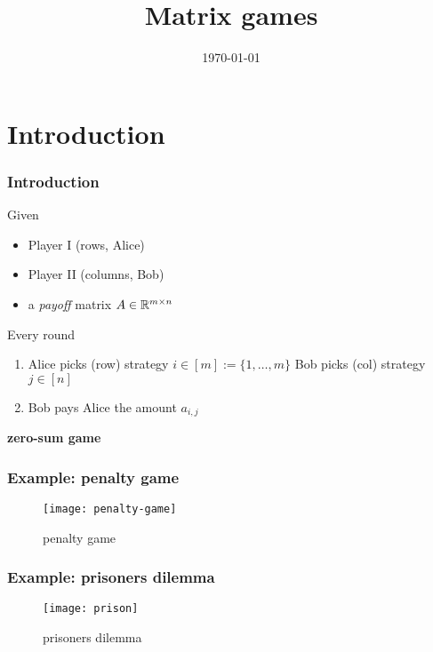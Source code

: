 \documentclass{beamer}
\title{Matrix games}
\date{\today}
\begin{document}
\maketitle
\frame{\tableofcontents}

\section{Introduction}%

\begin{frame}
  \frametitle{Introduction}
  Given
  \begin{itemize}
    \item Player I (rows, Alice)
          \item Player II (columns, Bob)
          \item a \emph{payoff} matrix $A \in \mathbb{R}^{m \times n}$
  \end{itemize}
  Every round
  \begin{enumerate}
    \item Alice picks (row) strategy $i\in [m]:= \{1,\dots, m\}$
          Bob picks (col) strategy $j\in [n]$
    \item Bob pays Alice the amount $a_{i,j}$
  \end{enumerate}
  \begin{center}
    \textbf{zero-sum game}
  \end{center}
\end{frame}

\begin{frame}
  \frametitle{Example: penalty game}
  \begin{figure}[ht]
    \centering
    \texttt{[image: penalty-game]}
    \caption{penalty game}
  \end{figure}
\end{frame}

\begin{frame}
  \frametitle{Example: prisoners dilemma}
  \begin{figure}[ht]
    \centering
    \texttt{[image: prison]}
    \caption{prisoners dilemma}
  \end{figure}
\end{frame}
\end{document}
